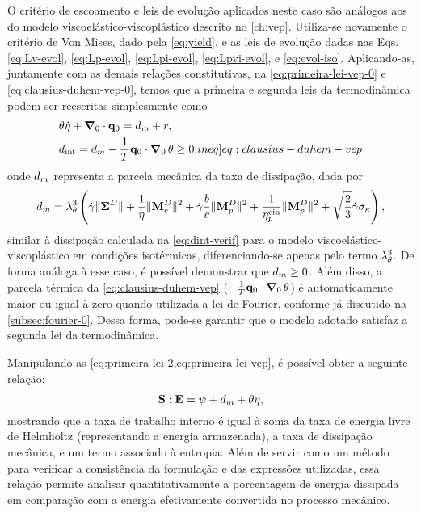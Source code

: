 \documentclass[Tese.tex]{subfiles}
\begin{document}
O critério de escoamento e leis de evolução aplicados neste caso são análogos aos do modelo viscoelástico-viscoplástico descrito no \autoref{ch:vep}. Utiliza-se novamente o critério de Von Mises, dado pela \cref{eq:yield}, e as leis de evolução dadas nas Eqs. \eqref{eq:Lv-evol}, \eqref{eq:Lp-evol}, \eqref{eq:Lpi-evol}, \eqref{eq:Lpvi-evol}, e \eqref{eq:evol-iso}. Aplicando-as, juntamente com as demais relações constitutivas, na \cref{eq:primeira-lei-vep-0} e \cref{eq:clausius-duhem-vep-0}, temos que a primeira e segunda leis da termodinâmica podem ser reescritas simplesmente como
\begin{align} 
	&\temp \dotentropy + \gradientei\cdot\qi = \dissipationmec + \calorInt, \label{eq:primeira-lei-vep} \\
	&\dissipation = \dissipationmec - \dfrac{1}{T}\qi\cdot\gradientei\,\temp \geq 0.  \label[ineq]{eq:clausius-duhem-vep}
\end{align}
onde $d_{m}$ representa a parcela mecânica da taxa de dissipação, dada por
\begin{equation} \label{eq:dissipation-mec}
	d_{m} = \lambda_{\theta}^3\left(\dot{\gamma}\|\boldsymbol{\Sigma}^D\| + \dfrac{1}{\eta}\|\mathbf{M}_e^D\|^2 + \dot{\gamma}\dfrac{b}{c}\|\mathbf{M}_p^D\|^2 + \dfrac{1}{\eta_{p}^\text{cin}}\|\mathbf{M}_{\tilde{p}}^D\|^2 + \sqrt{\dfrac{2}{3}}\dot{\gamma}\sigma_{\kappa}\right),
\end{equation}
similar à dissipação calculada na \cref{eq:dint-verif} para o modelo viscoelástico-viscoplástico em condições isotérmicas, diferenciando-se apenas pelo termo $\lambda_{\theta}^3$. De forma análoga à esse caso, é possível demonstrar que $d_{m} \geq 0$. Além disso, a parcela térmica da \cref{eq:clausius-duhem-vep} ($- \frac{1}{T}\mathbf{q}_0\cdot\boldsymbol{\nabla}_0\,\theta$) é automaticamente maior ou igual à zero quando utilizada a lei de Fourier, conforme já discutido na \autoref{subsec:fourier-0}. Dessa forma, pode-se garantir que o modelo adotado satisfaz a segunda lei da termodinâmica.

Manipulando as \cref{eq:primeira-lei-2,eq:primeira-lei-vep}, é possível obter a seguinte relação:
\begin{equation}\label{eq:work-rates}
\mathbf{S}:\dot{\mathbf{E}} = \dot{\psi} + d_{m} + \dot{\theta}\eta,
\end{equation}
mostrando que a taxa de trabalho interno é igual à soma da taxa de energia livre de Helmholtz (representando a energia armazenada), a taxa de dissipação mecânica, e um termo associado à entropia. Além de servir como um método para verificar a consistência da formulação e das expressões utilizadas, essa relação permite analisar quantitativamente a porcentagem de energia dissipada em comparação com a energia efetivamente convertida no processo mecânico.
\end{document}
